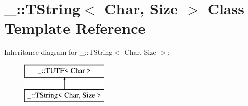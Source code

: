 \hypertarget{class___1_1_t_string}{}\section{\+\_\+\+:\+:T\+String$<$ Char, Size $>$ Class Template Reference}
\label{class___1_1_t_string}
Inheritance diagram for \+\_\+\+:\+:T\+String$<$ Char, Size $>$\+:\begin{figure}[H]
\begin{center}
\leavevmode
\includegraphics[height=2.000000cm]{class___1_1_t_string}
\end{center}
\end{figure}

